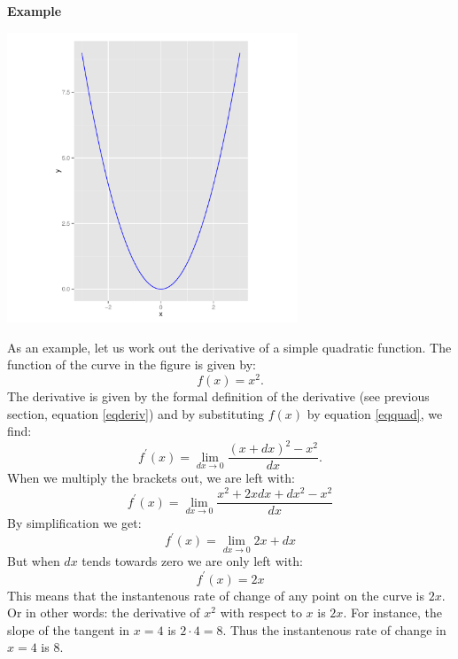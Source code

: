 \documentclass[a4paper]{report}
\begin{document}
\begin{mdframed}[backgroundcolor=exampcol]
\textbf{Example}\\
\begin{center}
\includegraphics[width=0.65\textwidth]{der_graphquad.pdf}\\
\end{center}
As an example, let us work out the derivative of a simple quadratic function. The function of the curve in the figure is given by: 
\begin{equation}
f(x)=x^2.
\label{eqquad}
\end{equation}
The derivative is given by the formal definition of the derivative (see previous section, equation \ref{eqderiv}) and by substituting $f(x)$ by equation \ref{eqquad}, we find:
\begin{equation}
f^\prime(x)=\lim\limits_{dx \to 0}\frac{(x+dx)^2-x^2}{dx}.
\end{equation}
When we multiply the brackets out, we are left with: 
\begin{equation}
f^\prime(x)=\lim\limits_{dx \to 0}\frac{x^2+2xdx+dx^2-x^2}{dx}
\end{equation}
By simplification we get:
\begin{equation} 
f^\prime(x)=\lim\limits_{dx \to 0}2x+dx
\end{equation}
But when $dx$ tends towards zero we are only left with:
\begin{equation}
f^\prime(x)=2x
\end{equation}
This means that the instantenous rate of change of any point on the curve is $2x$. Or in other words: the derivative of $x^2$ with respect to $x$ is $2x$. For instance, the slope of the tangent in $x=4$ is $2 \cdot 4=8$. Thus the instantenous rate of change in $x=4$ is $8$.
\end{mdframed}
\end{document}
